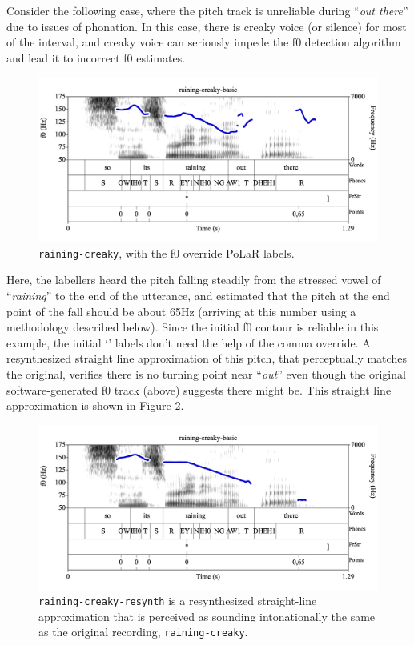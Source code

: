 \documentclass[11pt, twoside]{memoir}
\def\textlabel#1{{\relsize{-.5}\fontspec[Mapping=tex-text]{Roboto Mono}{#1}}}
\def\langtext#1{\textit{#1}}
\begin{document}
Consider the following case, where the pitch track is unreliable during “\langtext{out there}” due to issues of phonation. In this case, there is creaky voice (or silence) for most of the interval, and creaky voice can seriously impede the f0 detection algorithm and lead it to incorrect f0 estimates.



\begin{figure}[H]
\centering
%
\includegraphics[width=.875\linewidth]{Points-raining-creaky-basic-comma.png}
%
\caption{\texttt{raining-creaky}, with the f0 override PoLaR labels.%
\label{fig:raining-creaky Points comma}%
%
}
\end{figure}

Here, the labellers heard the pitch falling steadily from the stressed vowel of “\langtext{raining}” to the end of the utterance, and estimated that the pitch at the end point of the fall should be about 65Hz (arriving at this number using a methodology described below). Since the initial f0 contour is reliable in this example, the initial ‘\textlabel{0}’ labels don’t need the help of the comma override. A resynthesized straight line approximation of this pitch, that perceptually matches the original, verifies there is no turning point near “\langtext{out}” even though the original software-generated f0 track (above) suggests there might be. This straight line approximation is shown in Figure \ref{fig:raining-creaky Points basic resynth}.

\begin{figure}[H]
\centering
%
\includegraphics[width=.875\linewidth]{Points-raining-creaky-resynth-basic.png}
%
\caption{\texttt{raining-creaky-resynth} is a resynthesized straight-line approximation that is perceived as sounding intonationally the same as the original recording, \texttt{raining-creaky}.%
\label{fig:raining-creaky Points basic resynth}%
%
}
\end{figure}
\end{document}
